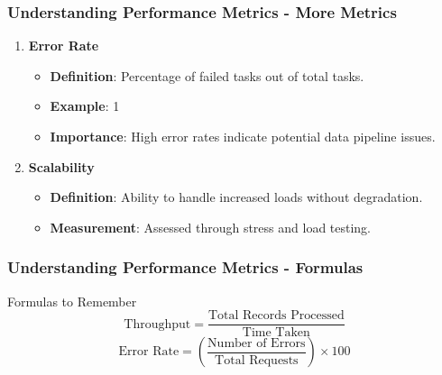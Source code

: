 \documentclass[aspectratio=169]{beamer}
\begin{document}
\begin{frame}[fragile]
    \frametitle{Understanding Performance Metrics - More Metrics}
    \begin{enumerate}[resume]
        \item \textbf{Error Rate}
            \begin{itemize}
                \item \textbf{Definition}: Percentage of failed tasks out of total tasks.
                \item \textbf{Example}: 1%
                \item \textbf{Importance}: High error rates indicate potential data pipeline issues.
            \end{itemize}
        
        \item \textbf{Scalability}
            \begin{itemize}
                \item \textbf{Definition}: Ability to handle increased loads without degradation.
                \item \textbf{Measurement}: Assessed through stress and load testing.
            \end{itemize}
    \end{enumerate}
\end{frame}

\begin{frame}[fragile]
    \frametitle{Understanding Performance Metrics - Formulas}
    \begin{block}{Formulas to Remember}
        \begin{equation}
            \text{Throughput} = \frac{\text{Total Records Processed}}{\text{Time Taken}}
        \end{equation}
        \begin{equation}
            \text{Error Rate} = \left( \frac{\text{Number of Errors}}{\text{Total Requests}} \right) \times 100
        \end{equation}
    \end{block}
\end{frame}
\end{document}

